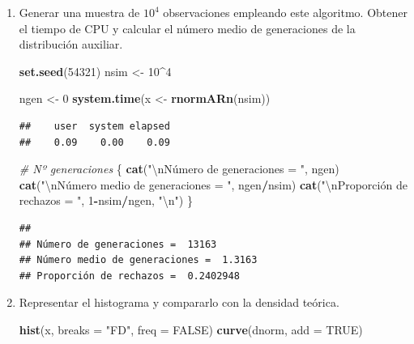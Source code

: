 \documentclass[
]{book}
\newenvironment{Shaded}{\begin{snugshade}}{\end{snugshade}}
\newcommand{\CharTok}[1]{\textcolor[rgb]{0.31,0.60,0.02}{#1}}
\newcommand{\CommentTok}[1]{\textcolor[rgb]{0.56,0.35,0.01}{\textit{#1}}}
\newcommand{\DataTypeTok}[1]{\textcolor[rgb]{0.13,0.29,0.53}{#1}}
\newcommand{\DecValTok}[1]{\textcolor[rgb]{0.00,0.00,0.81}{#1}}
\newcommand{\KeywordTok}[1]{\textcolor[rgb]{0.13,0.29,0.53}{\textbf{#1}}}
\newcommand{\NormalTok}[1]{#1}
\newcommand{\OperatorTok}[1]{\textcolor[rgb]{0.81,0.36,0.00}{\textbf{#1}}}
\newcommand{\OtherTok}[1]{\textcolor[rgb]{0.56,0.35,0.01}{#1}}
\newcommand{\StringTok}[1]{\textcolor[rgb]{0.31,0.60,0.02}{#1}}
\theoremstyle{break}
\theoremstyle{definition}
\theoremstyle{definition}
\theoremstyle{definition}
\theoremstyle{remark}
\begin{document}
\begin{enumerate}
\def\labelenumi{\alph{enumi})}
\item
  Generar una muestra de \(10^{4}\) observaciones empleando este
  algoritmo. Obtener el tiempo de CPU y calcular el número medio
  de generaciones de la distribución auxiliar.

\begin{Shaded}
\begin{Highlighting}[]
\KeywordTok{set.seed}\NormalTok{(}\DecValTok{54321}\NormalTok{)}
\NormalTok{nsim <-}\StringTok{ }\DecValTok{10}\OperatorTok{^}\DecValTok{4}

\NormalTok{ngen <-}\StringTok{ }\DecValTok{0}
\KeywordTok{system.time}\NormalTok{(x <-}\StringTok{ }\KeywordTok{rnormARn}\NormalTok{(nsim))}
\end{Highlighting}
\end{Shaded}

\begin{verbatim}
##    user  system elapsed 
##    0.09    0.00    0.09
\end{verbatim}

\begin{Shaded}
\begin{Highlighting}[]
\CommentTok{# Nº generaciones}
\NormalTok{\{}
\KeywordTok{cat}\NormalTok{(}\StringTok{"}\CharTok{\textbackslash{}n}\StringTok{Número de generaciones = "}\NormalTok{, ngen)}
\KeywordTok{cat}\NormalTok{(}\StringTok{"}\CharTok{\textbackslash{}n}\StringTok{Número medio de generaciones = "}\NormalTok{, ngen}\OperatorTok{/}\NormalTok{nsim)}
\KeywordTok{cat}\NormalTok{(}\StringTok{"}\CharTok{\textbackslash{}n}\StringTok{Proporción de rechazos = "}\NormalTok{, }\DecValTok{1}\OperatorTok{-}\NormalTok{nsim}\OperatorTok{/}\NormalTok{ngen, }\StringTok{"}\CharTok{\textbackslash{}n}\StringTok{"}\NormalTok{)}
\NormalTok{\}}
\end{Highlighting}
\end{Shaded}

\begin{verbatim}
## 
## Número de generaciones =  13163
## Número medio de generaciones =  1.3163
## Proporción de rechazos =  0.2402948
\end{verbatim}
\item
  Representar el histograma y compararlo con la densidad teórica.

\begin{Shaded}
\begin{Highlighting}[]
\KeywordTok{hist}\NormalTok{(x, }\DataTypeTok{breaks =} \StringTok{"FD"}\NormalTok{, }\DataTypeTok{freq =} \OtherTok{FALSE}\NormalTok{)}
\KeywordTok{curve}\NormalTok{(dnorm, }\DataTypeTok{add =} \OtherTok{TRUE}\NormalTok{)}
\end{Highlighting}
\end{Shaded}


\end{enumerate}
\end{document}
